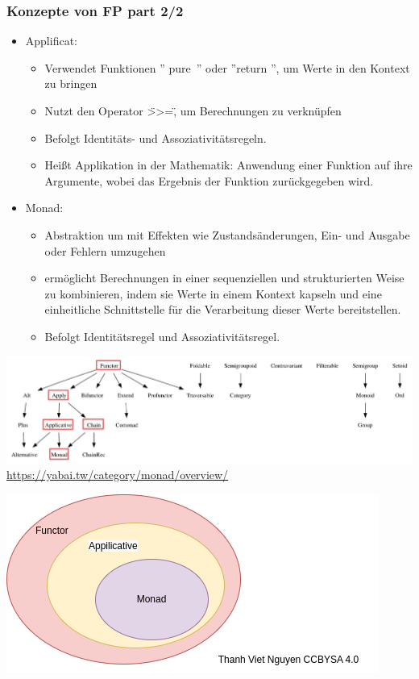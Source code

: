 \documentclass{beamer}
\begin{document}
\begin{frame}
\frametitle{Konzepte  von FP part 2/2} 
	\begin{itemize}
	    \item Applificat: 
	\begin{itemize}
		\item Verwendet Funktionen   '' pure\ '' oder  ''return '', um Werte in den Kontext zu bringen
		\item Nutzt den Operator \">>=\" , um Berechnungen zu verknüpfen
		\item Befolgt Identitäts- und Assoziativitätsregeln.
		\item Heißt Applikation in der Mathematik:  Anwendung einer Funktion auf ihre Argumente, wobei das Ergebnis der Funktion zurückgegeben wird. 
	\end{itemize}
	\item Monad: \begin{itemize}
		\item Abstraktion um mit Effekten wie Zustandsänderungen, Ein- und Ausgabe oder Fehlern umzugehen 
		\item ermöglicht  Berechnungen in einer sequenziellen und strukturierten Weise zu kombinieren, indem sie Werte in einem Kontext kapseln und eine einheitliche Schnittstelle für die Verarbeitung dieser Werte bereitstellen. 
		\item Befolgt Identitätsregel und Assoziativitätsregel.
	\end{itemize}
	\end{itemize}
\end{frame}

\begin{frame}
	\centering
\includegraphics[scale=0.3]{bilder/monad000.png}
\textmd{\tiny \url{https://yabai.tw/category/monad/overview/}}
\end{frame}

\begin{frame}
	\centering
	\includegraphics[scale=0.8]{bilder/functors.drawio.png}
\end{frame}
\end{document}
